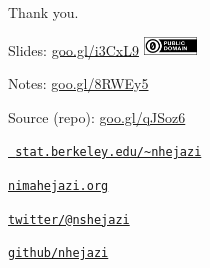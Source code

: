 \documentclass[12pt,t]{beamer}
\begin{document}
\begin{frame}[c]{Thank you.}

\Large
Slides: \href{https://goo.gl/i3CxL9}{goo.gl/i3CxL9} \quad
\includegraphics[height=5mm]{Figs/cc-zero.png}

\vspace{3mm}
Notes: \href{https://goo.gl/8RWEy5}{goo.gl/8RWEy5}

\vspace{3mm}
Source (repo): \href{https://goo.gl/qJSoz6}{goo.gl/qJSoz6}

\vspace{3mm}
\href{https://www.stat.berkeley.edu/~nhejazi}{\tt
  stat.berkeley.edu/\textasciitilde{}nhejazi}

\vspace{3mm}
\href{http://nimahejazi.org}{\tt nimahejazi.org}

\vspace{3mm}
\href{https://twitter.com/nshejazi}{\tt twitter/@nshejazi}

\vspace{3mm}
\href{https://github.com/nhejazi}{\tt github/nhejazi}


\end{frame}

\end{document}
